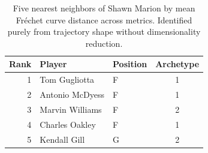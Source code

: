 \begin{table}[htbp]
  \centering\small
  \begin{tabular}{rllc}
    \toprule
    Rank & Player & Position & Archetype \\
    \midrule
    1 & Tom Gugliotta & F & 1 \\
    2 & Antonio McDyess & F & 1 \\
    3 & Marvin Williams & F & 2 \\
    4 & Charles Oakley & F & 1 \\
    5 & Kendall Gill & G & 2 \\
    \bottomrule
  \end{tabular}
  \caption{Five nearest neighbors of Shawn Marion by mean Fr\'{e}chet curve distance across metrics. Identified purely from trajectory shape without dimensionality reduction.}
  \label{tab:Shawn_Marion_frechet_curve_neighbors}
\end{table}

